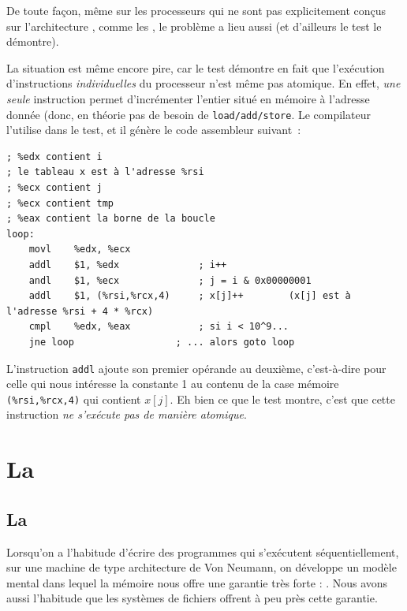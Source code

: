 De toute façon, même sur les processeurs qui ne sont pas explicitement conçus
sur l'architecture , comme les , le problème
a lieu aussi (et d'ailleurs le test le démontre).

\begin{ddanger} La situation est même encore pire, car le test démontre en fait
  que l'exécution d'instructions \emph{individuelles} du processeur n'est même
  pas atomique. En effet, \emph{une seule} instruction permet d'incrémenter
  l'entier situé en mémoire à l'adresse donnée (donc, en théorie pas de besoin
  de \texttt{load/add/store}. Le compilateur  l'utilise dans le
  test, et il génère le code assembleur suivant~:

  \begin{myfilet}
\begin{verbatim}
; %edx contient i
; le tableau x est à l'adresse %rsi
; %ecx contient j
; %ecx contient tmp
; %eax contient la borne de la boucle
loop:
	movl	%edx, %ecx            
	addl	$1, %edx              ; i++
	andl	$1, %ecx              ; j = i & 0x00000001
	addl	$1, (%rsi,%rcx,4)     ; x[j]++        (x[j] est à l'adresse %rsi + 4 * %rcx)
	cmpl	%edx, %eax            ; si i < 10^9...
	jne	loop                  ; ... alors goto loop
\end{verbatim}
  \end{myfilet}
  L'instruction \texttt{addl} ajoute son premier opérande au deuxième,
  c'est-à-dire pour celle qui nous intéresse la constante 1 au contenu de la
  case mémoire \verb|(%rsi,%rcx,4)| qui contient
  $x[j]$. Eh bien ce que le test montre, c'est que cette instruction \emph{ne
    s'exécute pas de manière atomique}.
\end{ddanger}%

\section{La \og {}\fg}

\subsection{La \og {}\fg}

Lorsqu'on a l'habitude d'écrire des programmes qui s'exécutent séquentiellement,
sur une machine de type \og architecture de Von Neumann\fg, on développe un
modèle mental dans lequel la mémoire nous offre une garantie très forte :
. Nous avons aussi l'habitude que les systèmes de fichiers offrent à
peu près cette garantie.

